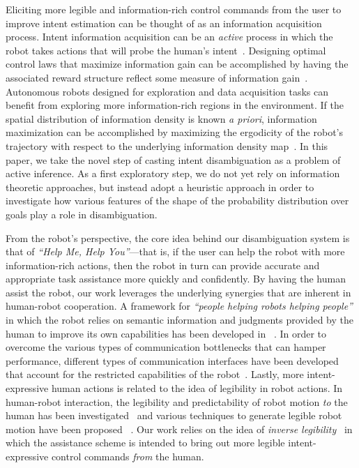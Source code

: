 \documentclass[natbib, twocolumn]{svjour3}          %
\begin{document}
Eliciting more legible and information-rich control commands from the user to improve intent estimation can be thought of as an information acquisition process. Intent information acquisition can be an \textit{active} process in which the robot takes actions that will probe the human's intent~\citep{sadigh2016information}. Designing optimal control laws that maximize information gain can be accomplished by having the associated reward structure reflect some measure of information gain~\citep{atanasov2014information}. 
Autonomous robots designed for exploration and data acquisition tasks can benefit from exploring more information-rich regions in the environment. If the spatial distribution of information density is known \textit{a priori}, information maximization can be accomplished by maximizing the ergodicity of the robot's trajectory with respect to the underlying information density map~\citep{miller2016ergodic, miller2013trajectory}. 
In this paper, we take the novel step of casting intent disambiguation as a problem of active inference. As a first exploratory step, we do not yet rely on information theoretic approaches, but instead adopt a heuristic approach in order to investigate how various features of the shape of the probability distribution over goals play a role in disambiguation.


From the robot's perspective, the core idea behind our disambiguation system is that of \textit{``Help Me, Help You''}---that is, if the user can help the robot with more information-rich actions, then the robot in turn can provide accurate and appropriate task assistance more quickly and confidently. By having the human assist the robot, our work leverages the underlying synergies that are inherent in human-robot cooperation. A framework for \textit{``people helping robots helping people''} in which the robot relies on semantic information and judgments provided by the human to improve its own capabilities has been developed in ~\citep{sorokin2010people}. In order to overcome the various types of communication bottlenecks that can hamper performance, different types of communication interfaces have been developed that account for the restricted capabilities of the robot~\citep{goodfellow2010help}. Lastly, more intent-expressive human actions is related to the idea of legibility in robot actions. In human-robot interaction, the legibility and predictability of robot motion \textit{to} the human has been investigated~\citep{dragan2013legibility} and various techniques to generate legible robot motion have been proposed ~\citep{holladay2014legible}. Our work relies on the idea of \textit{inverse legibility}~\citep{gopinath2017mode} in which the assistance scheme is intended to bring out more legible intent-expressive control commands \textit{from} the human. 
\end{document}
